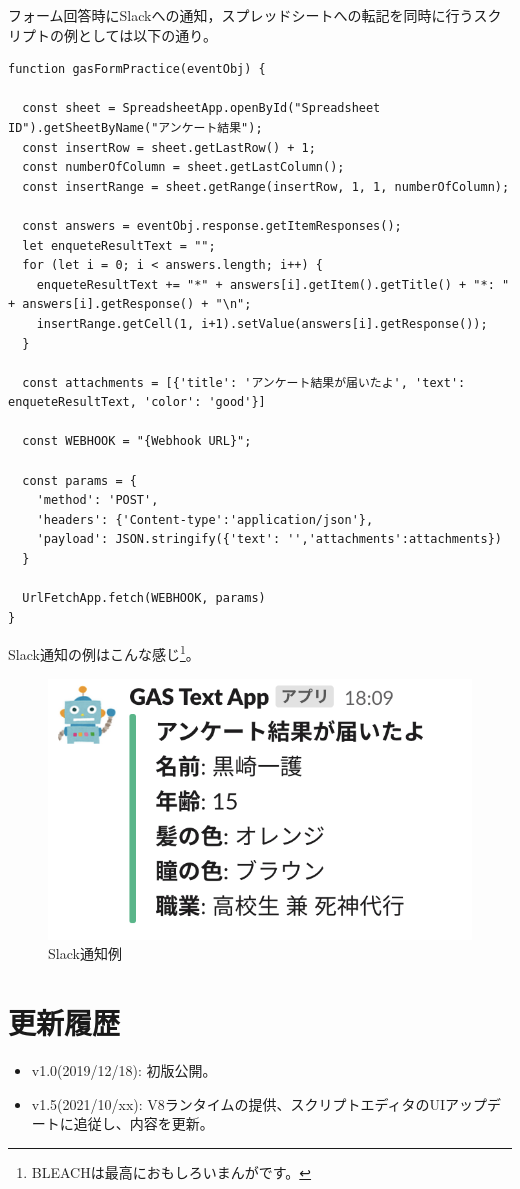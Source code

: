 \documentclass[uplatex,a4j]{jsarticle}
\begin{document}
フォーム回答時にSlackへの通知，スプレッドシートへの転記を同時に行うスクリプトの例としては以下の通り。

\begin{lstlisting}[basicstyle=\ttfamily\footnotesize,frame=single,caption=Script Example for Advanced practice]
function gasFormPractice(eventObj) {

  const sheet = SpreadsheetApp.openById("Spreadsheet ID").getSheetByName("アンケート結果");
  const insertRow = sheet.getLastRow() + 1;
  const numberOfColumn = sheet.getLastColumn();
  const insertRange = sheet.getRange(insertRow, 1, 1, numberOfColumn);
  
  const answers = eventObj.response.getItemResponses();
  let enqueteResultText = "";
  for (let i = 0; i < answers.length; i++) {
    enqueteResultText += "*" + answers[i].getItem().getTitle() + "*: " + answers[i].getResponse() + "\n";
    insertRange.getCell(1, i+1).setValue(answers[i].getResponse());
  }

  const attachments = [{'title': 'アンケート結果が届いたよ', 'text': enqueteResultText, 'color': 'good'}]
  
  const WEBHOOK = "{Webhook URL}";
  
  const params = {
    'method': 'POST',
    'headers': {'Content-type':'application/json'},
    'payload': JSON.stringify({'text': '','attachments':attachments})
  }
  
  UrlFetchApp.fetch(WEBHOOK, params)
}
\end{lstlisting}

Slack通知の例はこんな感じ\footnote{BLEACHは最高におもしろいまんがです。}。

\begin{figure}[H]
 \centering
 \includegraphics[keepaspectratio, scale=0.6]{images/advanced_slack_result.png}
 \caption{Slack通知例}
 \label{fig:advanced_slack_result}
\end{figure}

\section{更新履歴}

\begin{itemize}
  \item v1.0(2019/12/18): 初版公開。
  \item v1.5(2021/10/xx): V8ランタイムの提供、スクリプトエディタのUIアップデートに追従し、内容を更新。
\end{itemize}
\end{document}
